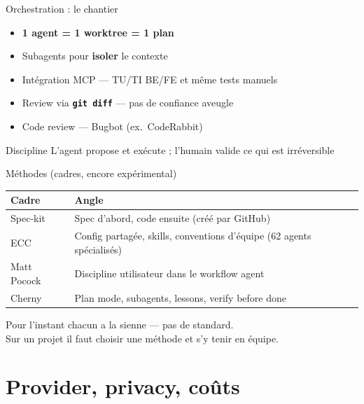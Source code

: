 \documentclass[aspectratio=169]{beamer}
\begin{document}
\begin{frame}{Orchestration : le chantier}
    \begin{itemize}
        \item \textbf{1 agent = 1 worktree = 1 plan}
        \item Subagents pour \textbf{isoler} le contexte 
        \item Intégration MCP --- TU/TI BE/FE et même tests manuels
        \item Review via \textbf{\texttt{git diff}} --- pas de confiance aveugle
        \item Code review --- Bugbot (ex.\ CodeRabbit)
    \end{itemize}
    \vspace{0.5cm}
    \begin{block}{Discipline}
        L'agent propose et exécute ; l'humain valide ce qui est irréversible
    \end{block}
\end{frame}

\begin{frame}{Méthodes (cadres, encore expérimental)}
    \begin{table}
        \centering
        \small
        \begin{tabular}{lp{10cm}}
            \toprule
            \textbf{Cadre} & \textbf{Angle} \\
            \midrule
            Spec-kit & Spec d'abord, code ensuite (créé par GitHub) \\
            ECC & Config partagée, skills, conventions d'équipe (62 agents spécialisés) \\
            Matt Pocock & Discipline utilisateur dans le workflow agent \\
            Cherny & Plan mode, subagents, lessons, verify before done \\
            \bottomrule
        \end{tabular}
    \end{table}
    \vspace{0.4cm}
    \centering
     Pour l'instant chacun a la sienne --- pas de standard.\\
    {\small Sur un projet il faut choisir une méthode et s'y tenir en équipe.}
\end{frame}

\section{Provider, privacy, coûts}
\end{document}
